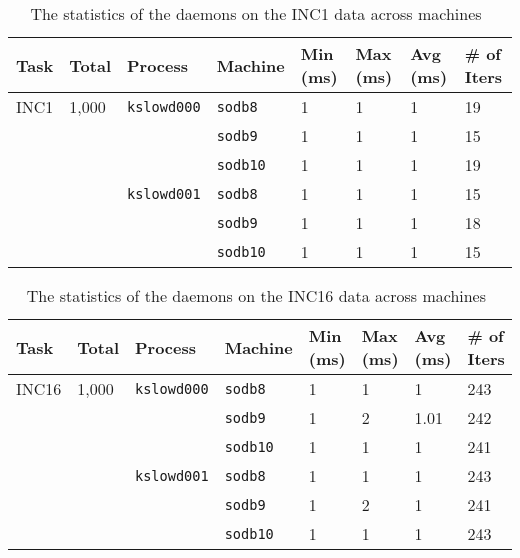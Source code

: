 \documentclass[10pt]{article}
\begin{document}
\begin{table}[htp!]
\centering
{\small
 \begin{tabular}{|l|l|l|l|l||l|l|l|} \hline
 Task & Total & Process & Machine & Min (ms) & Max (ms) & Avg (ms) & \# of Iters\\ \hline
 INC1 &  1,000 & {\tt kslowd000} & {\tt sodb8} & 1 & 1 & 1 & 19 \\ \hline
 &   &  & {\tt sodb9} & 1 & 1 & 1 & 15 \\ \hline
 &   &  & {\tt sodb10} & 1 & 1 & 1 & 19 \\ \hline 
 \hline
  &  & {\tt kslowd001} & {\tt sodb8} & 1 & 1 & 1 & 15 \\ \hline
 &   &  & {\tt sodb9} & 1 & 1 & 1 & 18 \\ \hline
 &   &  & {\tt sodb10} & 1 & 1 & 1 & 15 \\ \hline 
 \end{tabular}
  }
 \caption{The statistics of the daemons on the INC1 data across machines~\label{tab:inc1}}
\end{table}

\begin{table}[htp!]
\centering
{\small
 \begin{tabular}{|l|l|l|l|l||l|l|l|} \hline
 Task & Total & Process & Machine & Min (ms) & Max (ms) & Avg (ms) & \# of Iters\\ \hline
 INC16 &  1,000 & {\tt kslowd000} & {\tt sodb8} & 1 & 1 & 1 & 243 \\ \hline
 &   &  & {\tt sodb9} & 1 & 2 & 1.01 & 242 \\ \hline
 &   &  & {\tt sodb10} & 1 & 1 & 1 & 241 \\ \hline 
 \hline
  &  & {\tt kslowd001} & {\tt sodb8} & 1 & 1 & 1 & 243 \\ \hline
 &   &  & {\tt sodb9} & 1 & 2 & 1 & 241 \\ \hline
 &   &  & {\tt sodb10} & 1 & 1 & 1 & 243 \\ \hline 
 \end{tabular}
  }
 \caption{The statistics of the daemons on the INC16 data across machines~\label{tab:inc16}}
\end{table}
\end{document}
